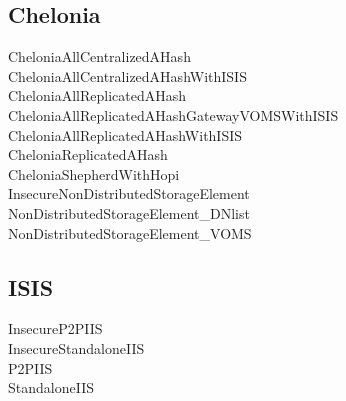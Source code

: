 \documentclass{article}
\begin{document}
\subsection{Chelonia}
\begin{description}
\item[CheloniaAllCentralizedAHash]
\item[CheloniaAllCentralizedAHashWithISIS]
\item[CheloniaAllReplicatedAHash]
\item[CheloniaAllReplicatedAHashGatewayVOMSWithISIS]
\item[CheloniaAllReplicatedAHashWithISIS]
\item[CheloniaReplicatedAHash]
\item[CheloniaShepherdWithHopi]
\item[InsecureNonDistributedStorageElement]
\item[NonDistributedStorageElement\_DNlist]
\item[NonDistributedStorageElement\_VOMS]
\end{description}

\subsection{ISIS}
\begin{description}
\item[InsecureP2PIIS]
\item[InsecureStandaloneIIS]
\item[P2PIIS]
\item[StandaloneIIS]
\end{description}
\end{document}
